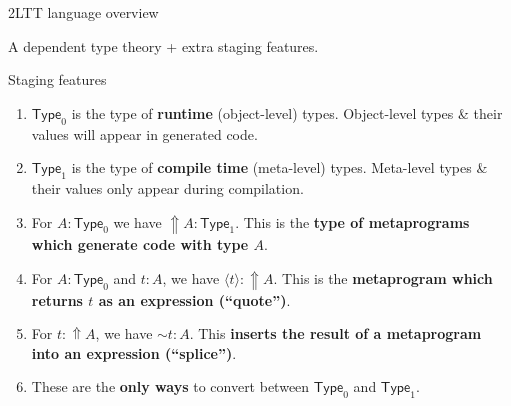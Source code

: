\documentclass[dvipsnames]{beamer}
\newcommand{\Type}{\mathsf{Type}}
\newcommand{\Lift}{{\Uparrow}}
\newcommand{\spl}{{\sim}}
\newcommand{\qut}[1]{\langle #1\rangle}
\begin{document}
\begin{frame}{2LTT language overview}

A dependent type theory + extra staging features.
\pause

\begin{block}{Staging features}
  \begin{enumerate}
  \item $\Type_0$ is the type of \textbf{runtime} (object-level) types. Object-level
    types \& their values will appear in generated code.
  \pause
  \item $\Type_1$ is the type of \textbf{compile time} (meta-level) types. Meta-level
    types \& their values only appear during compilation.
  \pause
  \item For $A : \Type_0$ we have $\Lift A : \Type_1$. This is the \textbf{type of metaprograms
    which generate code with type $A$}.
  \pause
  \item For $A : \Type_0$ and $t : A$, we have $\qut{t} : \Lift A$. This is the \textbf{metaprogram   which returns $t$ as an expression (``quote'')}.
  \pause
  \item For $t : \Lift A$, we have $\spl{t} : A$. This \textbf{inserts the result of a metaprogram into an expression (``splice'')}.
  \pause
  \item These are the \textbf{only ways} to convert between $\Type_0$ and $\Type_1$.
  \end{enumerate}
\end{block}
\end{frame}
\end{document}
